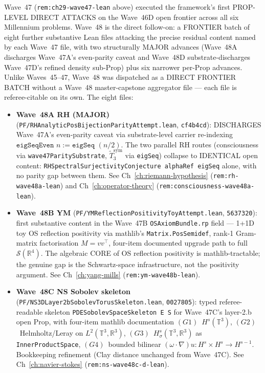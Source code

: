 \begin{remark}\label{rem:ch29-wave48-lean}
Wave~47 (\texttt{rem:ch29-wave47-lean} above) executed the framework's first PROP-LEVEL DIRECT ATTACKS on the Wave~46D open frontier across all six Millennium problems. Wave~48 is the direct follow-on: a FRONTIER batch of eight further substantive Lean files attacking the precise residual content named by each Wave~47 file, with two structurally MAJOR advances (Wave~48A discharges Wave~47A's even-parity caveat and Wave~48D substrate-discharges Wave~47D's refined density sub-Prop) plus six narrower per-Prop advances. Unlike Waves~45--47, Wave~48 was dispatched as a DIRECT FRONTIER BATCH without a Wave~48 master-capstone aggregator file --- each file is referee-citable on its own. The eight files:
\begin{itemize}
  \item \textbf{Wave~48A RH (MAJOR)} (\texttt{PF/RHAnalyticPosBijectionParityAttempt.lean}, \texttt{cf4b4cd}): DISCHARGES Wave~47A's even-parity caveat via substrate-level carrier re-indexing $\texttt{eigSeqEven } n := \texttt{eigSeq } (n / 2)$. The two parallel RH routes (consciousness via \texttt{wave47ParitySubstrate}, $\widetilde{T}_3^{\mathrm{sym}}$ via \texttt{eigSeq}) collapse to IDENTICAL open content: \texttt{RHSpectralSurjectivityConjecture alphaRef eigSeq} alone, with no parity gap between them. See Ch~\ref{ch:riemann-hypothesis} (\texttt{rem:rh-wave48a-lean}) and Ch~\ref{ch:operator-theory} (\texttt{rem:consciousness-wave48a-lean}).
  \item \textbf{Wave~48B YM} (\texttt{PF/YMReflectionPositivityToyAttempt.lean}, \texttt{5637320}): first substantive content in the Wave~47B \texttt{OSAxiomBundle.rp} field --- 1+1D toy OS reflection positivity via mathlib's \texttt{Matrix.PosSemidef}, rank-1 Gram-matrix factorisation $M = vv^\top$, four-item documented upgrade path to full $\mathcal{S}(\mathbb{R}^4)$. The algebraic CORE of OS reflection positivity is mathlib-tractable; the genuine gap is the Schwartz-space infrastructure, not the positivity argument. See Ch~\ref{ch:yang-mills} (\texttt{rem:ym-wave48b-lean}).
  \item \textbf{Wave~48C NS Sobolev skeleton} (\texttt{PF/NS3DLayer2bSobolevTorusSkeleton.lean}, \texttt{0027805}): typed referee-readable skeleton \texttt{PDESobolevSpaceSkeleton E S} for Wave~47C's layer-2.b open Prop, with four-item mathlib documentation $(G1)$~$H^s(\mathbb{T}^3)$, $(G2)$~Helmholtz/Leray on $L^2(\mathbb{T}^3, \mathbb{R}^3)$, $(G3)$~$H^s_\sigma(\mathbb{T}^3, \mathbb{R}^3)$ as \texttt{InnerProductSpace}, $(G4)$~bounded bilinear $(\omega \cdot \nabla) u : H^s \times H^s \to H^{s-1}$. Bookkeeping refinement (Clay distance unchanged from Wave~47C). See Ch~\ref{ch:navier-stokes} (\texttt{rem:ns-wave48c-d-lean}).

\end{itemize}
\end{remark}
